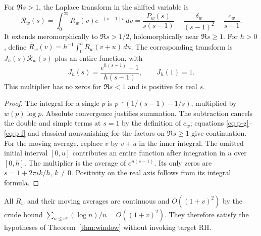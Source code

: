 \documentclass[11pt,letterpaper]{article}
\theoremstyle{definition}\newtheorem{definition}[theorem]{Definition}
\theoremstyle{remark}\newtheorem{remark}[theorem]{Remark}
\begin{document}
\begin{lemma}\label{lem:transform}
For $\Re s>1$, the Laplace transform in the shifted variable is
\begin{equation}\label{eq:transform}
\mathcal R_w(s)=\int_0^\infty R_w(v)e^{-(s-1)v}\,dv=\frac{P_w(s)}{s(s-1)}-\frac{\delta_w}{(s-1)^2}-\frac{c_w}{s-1}.
\end{equation}
It extends meromorphically to $\Re s>1/2$, holomorphically near $\Re s\ge1$. For $h>0$, define $\overline R_w(v)=h^{-1}\int_0^hR_w(v+u)\,du$. The corresponding transform is $J_h(s)\mathcal R_w(s)$ plus an entire function, with
\[
J_h(s)=\frac{e^{h(s-1)}-1}{h(s-1)},\qquad J_h(1)=1.
\]
This multiplier has no zeros for $\Re s<1$ and is positive for real $s$.
\end{lemma}
\begin{proof}
The integral for a single $p$ is $p^{-s}(1/(s-1)-1/s)$, multiplied by $w(p)\log p$. Absolute convergence justifies summation. The subtraction cancels the double and simple terms at $s=1$ by the definition of $c_w$; equations \eqref{eq:p-g}--\eqref{eq:p-f} and classical nonvanishing for the factors on $\Re s\ge1$ give continuation. For the moving average, replace $v$ by $v+u$ in the inner integral. The omitted initial interval $[0,u]$ contributes an entire function after integration in $u$ over $[0,h]$. The multiplier is the average of $e^{u(s-1)}$. Its only zeros are $s=1+2\pi i k/h$, $k\ne0$. Positivity on the real axis follows from its integral formula.
\end{proof}
All $R_w$ and their moving averages are continuous and $O((1+v)^2)$ by the crude bound $\sum_{n\le e^v}(\log n)/n=O((1+v)^2)$. They therefore satisfy the hypotheses of Theorem~\ref{thm:window} without invoking target RH.
\end{document}
